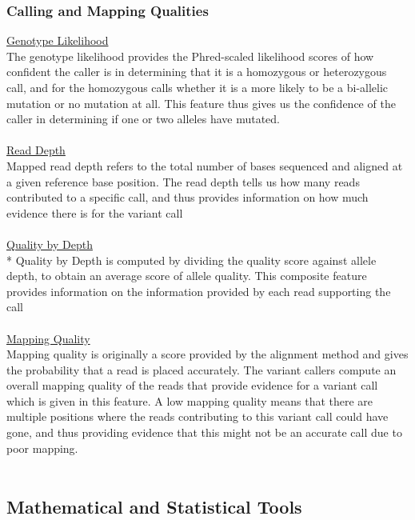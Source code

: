 \documentclass{article}
\begin{document}
\subsubsection{Calling and Mapping Qualities}
\underline{Genotype Likelihood}\\
The genotype likelihood provides the Phred-scaled likelihood scores of how confident the caller is in determining that it is a homozygous or heterozygous call, and for the homozygous calls whether it is a more likely to be a bi-allelic mutation or no mutation at all. This feature thus gives us the confidence of the caller in determining if one or two alleles have mutated. \\\\ 
\underline{Read Depth}\\
Mapped read depth refers to the total number of bases sequenced and aligned at a given reference base position. The read depth tells us how many reads contributed to a specific call, and thus provides information on how much evidence there is for the variant call\\\\
\underline{Quality by Depth}\\*
Quality by Depth is computed by dividing the quality score against allele depth, to obtain an average score of allele quality. This composite feature provides information on the information provided by each read supporting the call\\\\
\underline{Mapping Quality}\\
Mapping quality is originally a score provided by the alignment method and gives the probability that a read is placed accurately. The variant callers compute an overall mapping quality of the reads that provide evidence for a variant call which is given in this feature. A low mapping quality means that there are multiple positions where the reads contributing to this variant call could have gone, and thus providing evidence that this might not be an accurate call due to poor mapping.\\\\
\newpage
\subsection{Mathematical and Statistical Tools}
\end{document}
